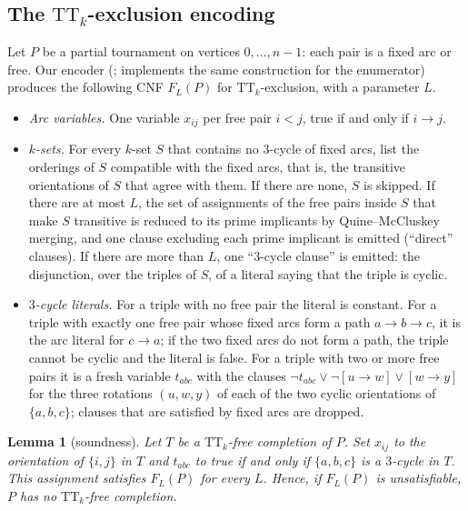 \documentclass[11pt]{amsart}
\newtheorem{lemma}[theorem]{Lemma}
\theoremstyle{definition}
\theoremstyle{remark}
\newcommand{\TT}[1]{\mathrm{TT}_{#1}}
\begin{document}
\subsection{The $\TT{k}$-exclusion encoding}\label{sec:encoding}
Let $P$ be a partial tournament on vertices $0,\dots,n-1$: each pair is a
fixed arc or free. Our encoder (;  implements the same
construction for the enumerator) produces the following CNF $F_L(P)$
for $\TT{k}$-exclusion, with a parameter $L$.
\begin{itemize}
\item \emph{Arc variables.} One variable $x_{ij}$ per free pair $i<j$, true if
  and only if $i \to j$.
\item \emph{$k$-sets.} For every $k$-set $S$ that contains no $3$-cycle of fixed
  arcs, list the orderings of $S$ compatible with the fixed arcs, that is, the
  transitive orientations of $S$ that agree with them. If there are none, $S$
  is skipped. If there are at most $L$, the set of assignments of the free
  pairs inside $S$ that make $S$ transitive is reduced to its prime
  implicants by Quine--McCluskey merging, and one clause excluding each prime
  implicant is emitted (``direct'' clauses). If there are more than $L$, one
  ``$3$-cycle clause'' is emitted: the disjunction, over the triples of $S$,
  of a literal saying that the triple is cyclic.
\item \emph{$3$-cycle literals.} For a triple with no free pair the literal is
  constant. For a triple with exactly one free pair whose fixed arcs form a
  path $a \to b \to c$, it is the arc literal for $c \to a$; if the two fixed
  arcs do not form a path, the triple cannot be cyclic and the literal is
  false. For a triple with
  two or more free pairs it is a fresh variable $t_{abc}$ with the clauses
  $\neg t_{abc} \vee \neg[u\to w] \vee [w\to y]$ for the three rotations
  $(u,w,y)$ of each of the two cyclic orientations of $\{a,b,c\}$; clauses
  that are satisfied by fixed arcs are dropped.
\end{itemize}

\begin{lemma}[soundness]\label{lem:sound}
Let $T$ be a $\TT{k}$-free completion of $P$. Set $x_{ij}$ to the orientation
of $\{i,j\}$ in $T$ and $t_{abc}$ to true if and only if $\{a,b,c\}$ is a
$3$-cycle in $T$. This assignment satisfies $F_L(P)$ for every $L$. Hence, if
$F_L(P)$ is unsatisfiable, $P$ has no $\TT{k}$-free completion.
\end{lemma}
\end{document}
